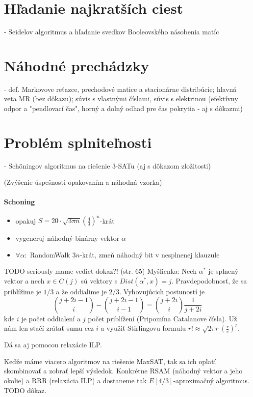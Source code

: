 \documentclass[12pt,a4paper]{article}
\begin{document}
\section{Hľadanie najkratších ciest}
 - Seidelov algoritmus a hľadanie svedkov Booleovského násobenia matíc
 

\section{Náhodné prechádzky}
 - def. Markovove reťazce, prechodové matice a stacionárne distribúcie; hlavná veta MR (bez dôkazu); súvis s vlastnými číslami, súvis s elektrinou (efektívny odpor a "pendlovací čas", horný a dolný odhad pre čas pokrytia - aj s dôkazmi)
 

\section{Problém splniteľnosti}
 - Schöningov algoritmus na riešenie 3-SATu (aj s dôkazom zložitosti)
 
(Zvýšenie úspešnosti opakovaním a náhodná vzorka) 
\paragraph{Schoning}
\begin{itemize} 
  \item opakuj $S = 20 \cdot \sqrt{3\pi n}(\frac{4}{3})^n$-krát
  \item vygeneruj náhodný binárny vektor $\alpha$
  \item $\forall \alpha:$ RandomWalk $3n$-krát, zmeň náhodný bit v nesplnenej klauzule
\end{itemize} 
TODO seriously mame vediet dokaz?! (str. 65) 
Myšlienka: Nech $\alpha^{*}$ je splnený vektor a nech $x \in C(j)$ sú vektory s $Dist(\alpha^{*}, x) = j$. Pravdepodobnosť, že sa priblížime je $1/3$ a že oddialime je $2/3$. Vyhovujúcich postuností je
$$
  \binom{j + 2i - 1}{i} - \binom{j + 2i - 1}{i - 1} = \binom{j + 2i}{i}\frac{1}{j + 2i}
$$
kde $i$ je počet oddialení a $j$ počet priblížení (Pripomína Catalanove čísla). Už nám len stačí zrátať sumu cez $i$ a využiť Stirlingovu formulu $r! \approx \sqrt{2\pi r}(\frac{r}{e})^r$. 

Dá sa aj pomocou relaxácie ILP. 

Keďže máme viacero algoritmov na riešenie MaxSAT, tak sa ich oplatí skombinovať a zobrať lepší výsledok. Konkrétne RSAM (náhodný vektor a jeho okolie) a RRR (relaxácia ILP) a dostaneme tak $E[4/3]$-aproximačný algoritmus. TODO dôkaz. 
\end{document}
